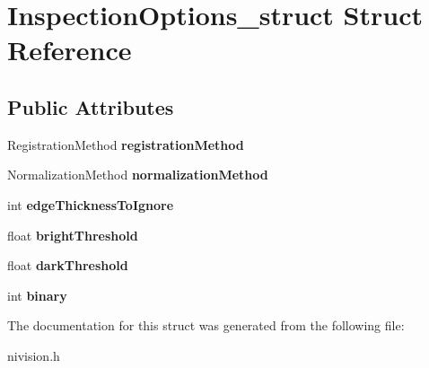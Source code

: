\hypertarget{structInspectionOptions__struct}{
\section{InspectionOptions\_\-struct Struct Reference}
\label{structInspectionOptions__struct}
}
\subsection*{Public Attributes}
\begin{DoxyCompactItemize}
\item 
\hypertarget{structInspectionOptions__struct_a6d23253e103310af3ef4d8cda9a1f68c}{
RegistrationMethod {\bfseries registrationMethod}}
\label{structInspectionOptions__struct_a6d23253e103310af3ef4d8cda9a1f68c}

\item 
\hypertarget{structInspectionOptions__struct_a10dbab7572da4e0d0b3653ac326dcb9d}{
NormalizationMethod {\bfseries normalizationMethod}}
\label{structInspectionOptions__struct_a10dbab7572da4e0d0b3653ac326dcb9d}

\item 
\hypertarget{structInspectionOptions__struct_ad5b031c4adca84ba964a8918935a1cec}{
int {\bfseries edgeThicknessToIgnore}}
\label{structInspectionOptions__struct_ad5b031c4adca84ba964a8918935a1cec}

\item 
\hypertarget{structInspectionOptions__struct_a3d8797809fc4d0c19ecf966722432b84}{
float {\bfseries brightThreshold}}
\label{structInspectionOptions__struct_a3d8797809fc4d0c19ecf966722432b84}

\item 
\hypertarget{structInspectionOptions__struct_a39040a70b2647d928409aeda2a306d5c}{
float {\bfseries darkThreshold}}
\label{structInspectionOptions__struct_a39040a70b2647d928409aeda2a306d5c}

\item 
\hypertarget{structInspectionOptions__struct_aff4b8d8ae70c598bdb7d9dbc6f42b27c}{
int {\bfseries binary}}
\label{structInspectionOptions__struct_aff4b8d8ae70c598bdb7d9dbc6f42b27c}

\end{DoxyCompactItemize}


The documentation for this struct was generated from the following file:\begin{DoxyCompactItemize}
\item 
nivision.h\end{DoxyCompactItemize}
